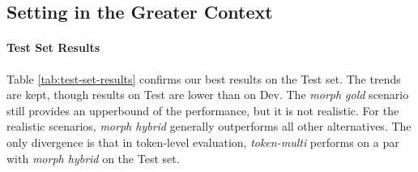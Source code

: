 \documentclass[11pt,a4paper]{article}
\newcommand{\MULMACRO}{{\em token-multi}\xspace}
\begin{document}
\begin{table}[t]
\centering
{}
\caption{\label{tab:test-set-results} 
Test vs.\ Dev: Results with fastText for all Models. {\em morph-gold}  presents an ideal upper-bound. 
  }
  \vspace{-0.1in}
\end{table}


\subsection{Setting in the Greater Context}

\paragraph{Test Set Results}
Table \ref{tab:test-set-results}  confirms our best  results on the Test set. 
The  trends are kept,  though  results on Test are lower than on  Dev. The {\em morph gold} scenario still provides an upperbound of the performance, but it is not realistic. For the realistic scenarios, {\em morph hybrid} generally outperforms all other alternatives. The only divergence is that in token-level evaluation, \MULMACRO performs on a par with {\em morph hybrid} on the Test set. 
\end{document}
